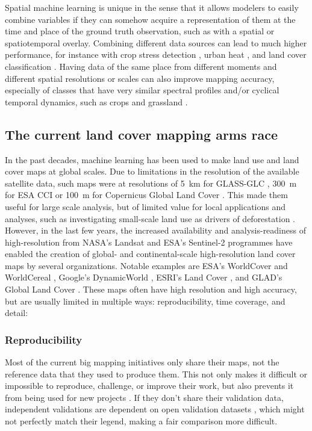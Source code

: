         Spatial machine learning is unique in the sense that it allows modelers to easily combine variables if they can somehow acquire a representation of them at the time and place of the ground truth observation, such as with a spatial or spatiotemporal overlay. Combining different data sources can lead to much higher performance, for instance with crop stress detection  \citep{berger2022multi}, urban heat \citep{shahi2015novel}, and land cover classification \citep{zhu2016optimizing, hurskainen2019auxiliary, hosseiny2022urban,xu20183d}. Having data of the same place from different moments \citep{low2013impact} and different spatial resolutions or scales \citep{santos2012multiscale} can also improve mapping accuracy, especially of classes that have very similar spectral profiles and/or cyclical temporal dynamics, such as crops and grassland \citep{esch2014differentiation}.

\subsection*{The current land cover mapping arms race}

   In the past decades, machine learning has been used to make land use and land cover maps at global scales. Due to limitations in the resolution of the available satellite data, such maps were at resolutions of 5~km for GLASS-GLC \citep{liu2020annual}, 300~m for ESA CCI \citep{defourny2012land} or 100~m for Copernicus Global Land Cover \citep{buchhorn2020copernicus}. This made them useful for large scale analysis, but of limited value for local applications and analyses, such as investigating small-scale land use as drivers of deforestation \citep{masolele2024mapping}. However, in the last few years, the increased availability and analysis-readiness of high-resolution from NASA's Landsat and ESA's Sentinel-2 programmes have enabled the creation of global- and continental-scale high-resolution land cover maps by several organizations. Notable examples are ESA's WorldCover \citep{kerchove2021esa} and WorldCereal \citep{tricht2023worldcereal}, Google's DynamicWorld \citep{brown2022dynamic}, ESRI's Land Cover \citep{karra2021global}, and GLAD's Global Land Cover \citep{potapov2022global}.
    These maps often have high resolution and high accuracy, but are usually limited in multiple ways: reproducibility, time coverage, and detail:
    
    \subsubsection{Reproducibility}
        Most of the current big mapping initiatives only share their maps, not the reference data that they used to produce them. This not only makes it difficult or impossible to reproduce, challenge, or improve their work, but also prevents it from being used for new projects \citep{tsendbazar2015assessing}. If they don't share their validation data, independent validations are dependent on open validation datasets \citep{venter2022global}, which might not perfectly match their legend, making a fair comparison more difficult.
    
